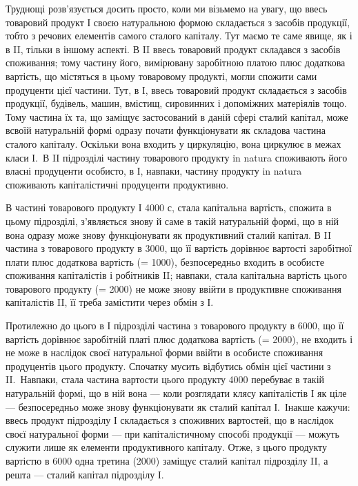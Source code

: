 

Труднощі розв’язується досить просто, коли ми візьмемо на увагу,
що ввесь товаровий продукт І своєю натуральною формою складається
з засобів продукції, тобто з речових елементів самого сталого капіталу.
Тут маємо те саме явище, як і в II, тільки в іншому аспекті. В II ввесь товаровий
продукт складався з засобів споживання; тому частину його, вимірювану
заробітною платою плюс додаткова вартість, що містяться в цьому товаровому
продукті, могли спожити сами продуценти цієї частини. Тут, в
І, ввесь товаровий продукт складається з засобів продукції, будівель, машин,
вмістищ, сировинних і допоміжних матеріялів тощо. Тому частина їх
та, що заміщує застосований в даній сфері сталий капітал, може всвоїй натуральній
формі одразу почати функціонувати як складова частина сталого
капіталу. Оскільки вона входить у циркуляцію, вона циркулює в межах
класи І.~В II підрозділі частину товарового продукту in natura споживають
його власні продуценти особисто, в І, навпаки, частину продукту
in natura споживають капіталістичні продуценти продуктивно.

В частині товарового продукту І \deq{} 4000 с, стала капітальна вартість,
спожита в цьому підрозділі, з’являється знову й саме в такій натуральній
формі, що в ній вона одразу може знову функціонувати як продуктивний
сталий капітал. В II частина з товарового продукту в 3000, що її вартість
дорівнює вартості заробітної плати плюс додаткова вартість (= 1000),
безпосередньо входить в особисте споживання капіталістів і робітників II;
навпаки, стала капітальна вартість цього товарового продукту (= 2000)
не може знову ввійти в продуктивне споживання капіталістів II, її треба
замістити через обмін з І.

Протилежно до цього в І підрозділі частина з товарового продукту
в 6000, що її вартість дорівнює заробітній платі плюс додаткова вартість
(= 2000), не входить і не може в наслідок своєї натуральної форми
ввійти в особисте споживання продуцентів цього продукту. Спочатку
мусить відбутись обмін цієї частини з II.~Навпаки, стала частина вартости
цього продукту \deq{} 4000 перебуває в такій натуральній формі, що в ній
вона — коли розглядати клясу капіталістів І як ціле — безпосередньо може
знову функціонувати як сталий капітал І.~Інакше кажучи: ввесь продукт
підрозділу І складається з споживних вартостей, що в наслідок своєї натуральної
форми — при капіталістичному способі продукції — можуть служити
лише як елементи продуктивного капіталу. Отже, з цього продукту
вартістю в 6000 одна третина (2000) заміщує сталий капітал підрозділу II,
а решта  — сталий капітал підрозділу І.


